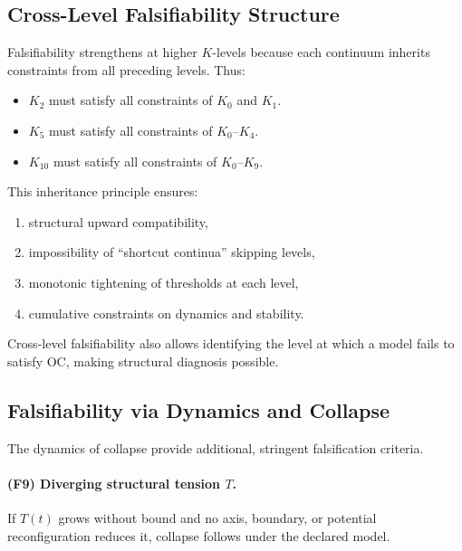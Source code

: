 \subsection{Cross-Level Falsifiability Structure}

Falsifiability strengthens at higher $K$-levels because each continuum
inherits constraints from all preceding levels.
Thus:

\begin{itemize}
    \item $K_2$ must satisfy all constraints of $K_0$ and $K_1$.
    \item $K_5$ must satisfy all constraints of $K_0$–$K_4$.
    \item $K_{10}$ must satisfy all constraints of $K_0$–$K_9$.
\end{itemize}

This inheritance principle ensures:

\begin{enumerate}
    \item structural upward compatibility,
    \item impossibility of “shortcut continua” skipping levels,
    \item monotonic tightening of thresholds at each level,
    \item cumulative constraints on dynamics and stability.
\end{enumerate}

Cross-level falsifiability also allows identifying the level at which a
model fails to satisfy OC, making structural diagnosis possible.



\subsection{Falsifiability via Dynamics and Collapse}

The dynamics of collapse provide additional, stringent falsification
criteria.

\paragraph{(F9) Diverging structural tension \texorpdfstring{$T$}{T}.}
If $T(t)$ grows without bound and no axis, boundary, or potential
reconfiguration reduces it, collapse follows under the declared model.

